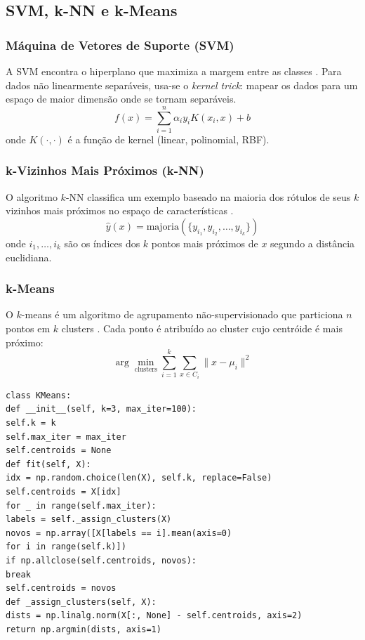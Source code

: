 \subsection{SVM, k-NN e k-Means}
\subsubsection{Máquina de Vetores de Suporte (SVM)}
A SVM encontra o hiperplano que maximiza a margem entre as classes
\cite{cortes1995support}. Para dados não linearmente separáveis, usa-se o
\textit{kernel trick}: mapear os dados para um espaço de maior dimensão onde
se tornam separáveis.
\[f(x) = \sum_{i=1}^n \alpha_i y_i K(x_i, x) + b
\]
onde $K(\cdot, \cdot)$ é a função de kernel (linear, polinomial, RBF).
\subsubsection{k-Vizinhos Mais Próximos (k-NN)}
O algoritmo $k$-NN classifica um exemplo baseado na maioria dos rótulos de
seus $k$ vizinhos mais próximos no espaço de características
\cite{fix1989discriminatory}.
\[\hat{y}(x) = \text{majoria}\left(\{y_{i_1}, y_{i_2}, \ldots, y_{i_k}\}\right)
\]
onde $i_1, \ldots, i_k$ são os índices dos $k$ pontos mais próximos de $x$
segundo a distância euclidiana.
\subsubsection{k-Means}
O $k$-means é um algoritmo de agrupamento não-supervisionado que particiona
$n$ pontos em $k$ clusters \cite{lloyd1982least}. Cada ponto é atribuído ao
cluster cujo centróide é mais próximo:
\[\arg\min_{\text{clusters}} \sum_{i=1}^k \sum_{x \in C_i} \|x - \mu_i\|^2
\]
\begin{lstlisting}[style=pythonstyle]
class KMeans:
def __init__(self, k=3, max_iter=100):
self.k = k
self.max_iter = max_iter
self.centroids = None
def fit(self, X):
idx = np.random.choice(len(X), self.k, replace=False)
self.centroids = X[idx]
for _ in range(self.max_iter):
labels = self._assign_clusters(X)
novos = np.array([X[labels == i].mean(axis=0)
for i in range(self.k)])
if np.allclose(self.centroids, novos):
break
self.centroids = novos
def _assign_clusters(self, X):
dists = np.linalg.norm(X[:, None] - self.centroids, axis=2)
return np.argmin(dists, axis=1)
\end{lstlisting}
